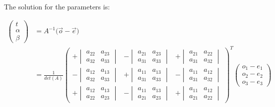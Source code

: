 \documentclass[11pt,a4paper,oneside]{article}
\begin{document}
The solution for the parameters is:

\begin{align}
\begin{pmatrix} t \\ \alpha \\ \beta \end{pmatrix} &= A^{-1} \big( \vec{o} - \vec{e} \big) \\
&= \frac{1}{det(A)} \begin{pmatrix} +\begin{vmatrix} a_{22} & a_{23} \\ a_{32} & a_{33} \end{vmatrix}  & -\begin{vmatrix} a_{21} & a_{23} \\ a_{31} & a_{33} \end{vmatrix} & +\begin{vmatrix} a_{21} & a_{22} \\ a_{31} & a_{32} \end{vmatrix} \\[8pt] -\begin{vmatrix} a_{12} & a_{13} \\ a_{32} & a_{33} \end{vmatrix} & +\begin{vmatrix} a_{11} & a_{13} \\ a_{31} & a_{33} \end{vmatrix} & -\begin{vmatrix} a_{11} & a_{12} \\ a_{31} & a_{32} \end{vmatrix} \\[8pt] +\begin{vmatrix} a_{12} & a_{13} \\ a_{22} & a_{23} \end{vmatrix} & -\begin{vmatrix} a_{11} & a_{13} \\ a_{21} & a_{23} \end{vmatrix} & +\begin{vmatrix} a_{11} & a_{12} \\ a_{21} & a_{22} \end{vmatrix} \end{pmatrix} ^T \begin{pmatrix} o_1 - e_1 \\ o_2 - e_2 \\ o_3 - e_3 \end{pmatrix} \\

\end{align}
\end{document}
